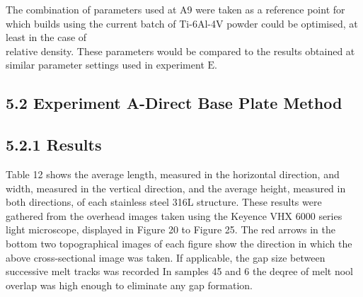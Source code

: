 \documentclass[10pt]{article}
\begin{document}
The combination of parameters used at A9 were taken as a reference point for which builds using the current batch of Ti-6Al-4V powder could be optimised, at least in the case of\\
relative density. These parameters would be compared to the results obtained at similar parameter settings used in experiment $\mathrm{E}$.

\subsection*{5.2 Experiment A-Direct Base Plate Method}
\subsection*{5.2.1 Results}
Table 12 shows the average length, measured in the horizontal direction, and width, measured in the vertical direction, and the average height, measured in both directions, of each stainless steel 316L structure. These results were gathered from the overhead images taken using the Keyence VHX 6000 series light microscope, displayed in Figure 20 to Figure 25. The red arrows in the bottom two topographical images of each figure show the direction in which the above cross-sectional image was taken. If applicable, the gap size between successive melt tracks was recorded In samples 45 and 6 the deqree of melt nool overlap was high enough to eliminate any gap formation.
\end{document}
